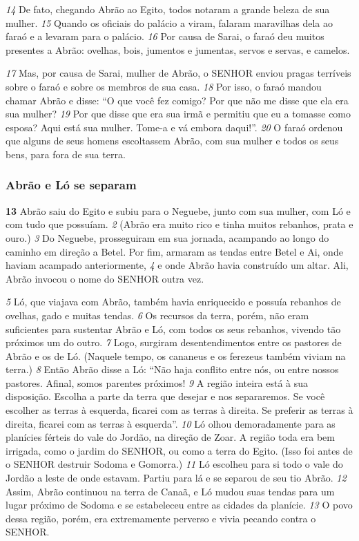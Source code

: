 \bigskip
\textit{\tiny 14}
De fato, chegando Abrão ao Egito, todos notaram a grande beleza de sua
mulher. 
\textit{\tiny 15}
Quando os oficiais do palácio a viram, falaram maravilhas dela ao faraó
e a levaram para o palácio. 
\textit{\tiny 16}
Por causa de Sarai, o faraó deu muitos presentes a
Abrão: ovelhas, bois, jumentos e jumentas, servos e servas, e camelos.

\bigskip
\textit{\tiny 17}
Mas, por causa de Sarai, mulher de Abrão, o SENHOR enviou pragas terríveis
sobre o faraó e sobre os membros de sua casa. 
\textit{\tiny 18}
Por isso, o faraó mandou chamar
Abrão e disse: “O que você fez comigo? Por que não me disse que ela era sua
mulher? 
\textit{\tiny 19}
Por que disse que era sua irmã e permitiu que eu a tomasse como
esposa? Aqui está sua mulher. Tome-a e vá embora daqui!”. 
\textit{\tiny 20}
O faraó ordenou
que alguns de seus homens escoltassem Abrão, com sua mulher e todos os seus
bens, para fora de sua terra.

\bigskip
\subsubsection*{Abrão e Ló se separam}
\textbf{\large 13}
 Abrão saiu do Egito e subiu para o Neguebe, junto com sua mulher, com Ló
e com tudo que possuíam. 
\textit{\tiny 2}
(Abrão era muito rico e tinha muitos rebanhos, prata e
ouro.) 
\textit{\tiny 3}
Do Neguebe, prosseguiram em sua jornada, acampando ao longo do
caminho em direção a Betel. Por fim, armaram as tendas entre Betel e Ai, onde
haviam acampado anteriormente, 
\textit{\tiny 4}
e onde Abrão havia construído um altar. Ali,
Abrão invocou o nome do SENHOR outra vez.

\bigskip
\textit{\tiny 5}
Ló, que viajava com Abrão, também havia enriquecido e possuía rebanhos de
ovelhas, gado e muitas tendas. 
\textit{\tiny 6}
Os recursos da terra, porém, não eram suficientes para sustentar Abrão e Ló, com todos os seus rebanhos, vivendo tão próximos um
do outro. 
\textit{\tiny 7}
Logo, surgiram desentendimentos entre os pastores de Abrão e os de
Ló. (Naquele tempo, os cananeus e os ferezeus também viviam na terra.)
\textit{\tiny 8}
Então Abrão disse a Ló: “Não haja conflito entre nós, ou entre nossos pastores.
Afinal, somos parentes próximos! 
\textit{\tiny 9}
A região inteira está à sua disposição. Escolha
a parte da terra que desejar e nos separaremos. Se você escolher as terras à
esquerda, ficarei com as terras à direita. Se preferir as terras à direita, ficarei com
as terras à esquerda”.
\textit{\tiny 10}
Ló olhou demoradamente para as planícies férteis do vale do Jordão, na
direção de Zoar. A região toda era bem irrigada, como o jardim do SENHOR, ou
como a terra do Egito. (Isso foi antes de o SENHOR destruir Sodoma e Gomorra.)
\textit{\tiny 11}
Ló escolheu para si todo o vale do Jordão a leste de onde estavam. Partiu para lá
e se separou de seu tio Abrão. 
\textit{\tiny 12}
Assim, Abrão continuou na terra de Canaã, e Ló
mudou suas tendas para um lugar próximo de Sodoma e se estabeleceu entre as
cidades da planície. 
\textit{\tiny 13}
O povo dessa região, porém, era extremamente perverso e
vivia pecando contra o SENHOR.


